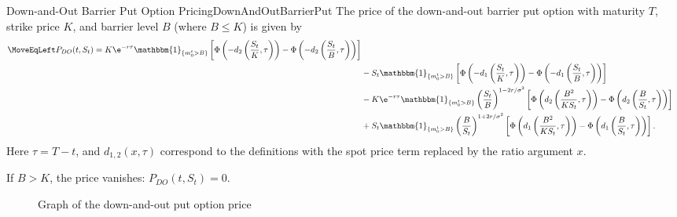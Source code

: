 \begin{prop}{Down-and-Out Barrier Put Option Pricing}{DownAndOutBarrierPut}
	The price of the down-and-out barrier put option with maturity \(T\), strike price \(K\), and barrier level \(B\) (where \(B \le K\)) is given by
	\begin{align}
		\MoveEqLeft P_{DO}(t, S_t) = K \e^{-r\tau} \mathbbm{1}_{\{m_0^t > B\}} \left[ \Phi \left( -d_2 \left( \frac{S_t}{K}, \tau \right) \right) - \Phi \left( -d_2 \left( \frac{S_t}{B}, \tau \right) \right) \right] \nonumber                        \\
		 & - S_t \mathbbm{1}_{\{m_0^t > B\}} \left[ \Phi \left( -d_1 \left( \frac{S_t}{K}, \tau \right) \right) - \Phi \left( -d_1 \left( \frac{S_t}{B}, \tau \right) \right) \right] \nonumber                                                          \\
		 & - K \e^{-r\tau} \mathbbm{1}_{\{m_0^t > B\}} \left( \frac{S_t}{B} \right)^{1-2r/\sigma^2} \left[ \Phi \left( d_2 \left( \frac{B^2}{K S_t}, \tau \right) \right) - \Phi \left( d_2 \left( \frac{B}{S_t}, \tau \right) \right) \right] \nonumber \\
		 & + S_t \mathbbm{1}_{\{m_0^t > B\}} \left( \frac{B}{S_t} \right)^{1+2r/\sigma^2} \left[ \Phi \left( d_1 \left( \frac{B^2}{K S_t}, \tau \right) \right) - \Phi \left( d_1 \left( \frac{B}{S_t}, \tau \right) \right) \right].
	\end{align}
	Here \(\tau = T-t\), and \(d_{1,2}(x, \tau)\) correspond to the definitions with the spot price term replaced by the ratio argument \(x\).

	If \(B > K\), the price vanishes: \(P_{DO}(t, S_t) = 0\).
\end{prop}

\begin{figure}[H]
	\centering
	
	\caption{Graph of the down-and-out put option price}
	\label{fig:downAndOutPutBarrierSurface}
\end{figure}

